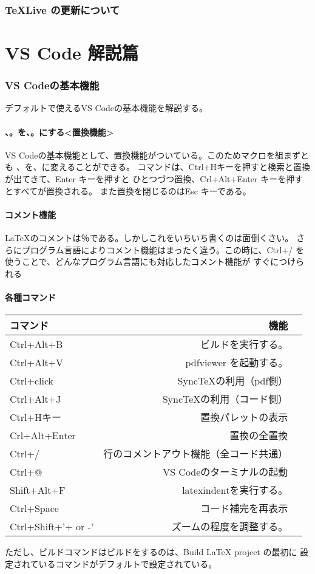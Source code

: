 \documentclass{ltjsarticle}
\begin{document}
\section{\TeX Live の更新について}

\part{VS Code 解説篇}
\section{VS Codeの基本機能}
デフォルトで使えるVS Codeの基本機能を解説する。
\subsection{、。を、。にする<置換機能>}
VS Codeの基本機能として、置換機能がついている。このためマクロを組まずとも
、を、に変えることができる。
コマンドは、Ctrl+Hキーを押すと検索と置換が出てきて、Enter キーを押すと
ひとつづつ置換、Crl+Alt+Enter キーを押すとすべてが置換される。
また置換を閉じるのはEsc キーである。
\subsection{コメント機能}
\LaTeX のコメントは％である。しかしこれをいちいち書くのは面倒くさい。
さらにプログラム言語によりコメント機能はまったく違う。この時に、Ctrl+/ を
使うことで、どんなプログラム言語にも対応したコメント機能が
すぐにつけられる
\subsection{各種コマンド}
\begin{center}
  \begin{tabular}{lrr} \hline
  コマンド            & 機能                  \\ \hline
  Ctrl+Alt+B          & ビルドを実行する。           \\
  Ctrl+Alt+V          & pdfviewer を起動する。    \\
  Ctrl+click          & SyncTeXの利用（pdf側）    \\
Ctrl+Alt+J            & SyncTeXの利用（コード側）    \\
  Ctrl+Hキー          & 置換パレットの表示           \\
    Crl+Alt+Enter     & 置換の全置換              \\
    Ctrl+/            & 行のコメントアウト機能（全コード共通） \\
    Ctrl+@            & VS Codeのターミナルの起動     \\
    Shift+Alt+F       & latexindentを実行する。\\
    Ctrl+Space        & コード補完を再表示\\
    Ctrl+Shift+'+ or -' & ズームの程度を調整する。        \\ \hline
  \end{tabular}
\end{center}
ただし、ビルドコマンドはビルドをするのは、Build LaTeX project の最初に
設定されているコマンドがデフォルトで設定されている。
\end{document}
